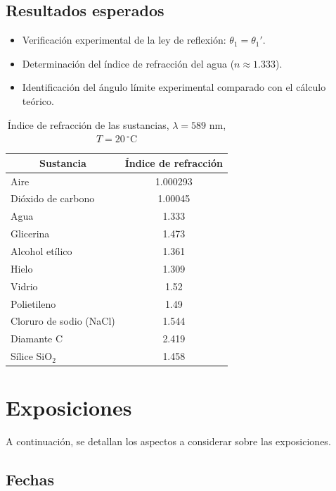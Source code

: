 \subsection{Resultados esperados}

\begin{itemize}
    \item Verificación experimental de la ley de reflexión: $\theta_1 = \theta_1'$.
    \item Determinación del índice de refracción del agua ($n \approx 1.333$).
    \item Identificación del ángulo límite experimental comparado con el cálculo teórico.
\end{itemize}

\begin{table}[H]
\centering
\caption{Índice de refracción de las sustancias, $\lambda = 589 \text{ nm}$, $T = 20\,^\circ\text{C}$}
\label{tab:tab-indices}
    \begin{tabular}{|l|c|}
        \hline
        \multicolumn{1}{|c|}{\textbf{Sustancia}} & \textbf{Índice de refracción} \\ \hline
        Aire & 1.000293 \\ \hline
        Dióxido de carbono & 1.00045 \\ \hline
        Agua & 1.333 \\ \hline
        Glicerina & 1.473 \\ \hline
        Alcohol etílico & 1.361 \\ \hline
        Hielo & 1.309 \\ \hline
        Vidrio & 1.52 \\ \hline
        Polietileno & 1.49 \\ \hline
        Cloruro de sodio (NaCl) & 1.544 \\ \hline
        Diamante C & 2.419 \\ \hline
        Sílice $\text{SiO}_2$ & 1.458 \\ \hline
    \end{tabular}
\end{table}

\section{Exposiciones}

A continuación, se detallan los aspectos a considerar sobre las exposiciones.

\subsection{Fechas}

